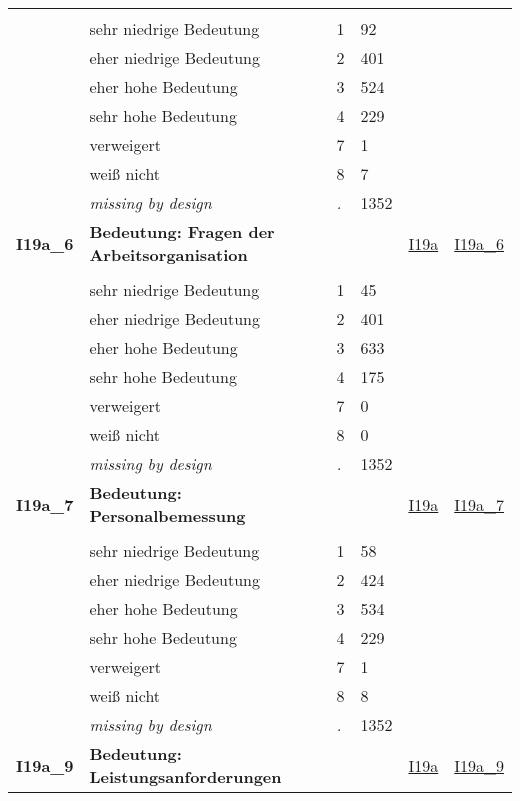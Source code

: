 \begin{longtable}{| L{2.45cm} | L{6cm} | C{1.5cm} | R{1cm} | C{2.25cm} | C{2.25cm} |}
   &  &  &  &  &  \\ 
   & sehr niedrige Bedeutung & 1 & 92 &  &  \\ 
   & eher niedrige Bedeutung & 2 & 401 &  &  \\ 
   & eher hohe Bedeutung & 3 & 524 &  &  \\ 
   & sehr hohe Bedeutung & 4 & 229 &  &  \\ 
   & verweigert & 7 & 1 &  &  \\ 
   & weiß nicht & 8 & 7 &  &  \\ 
   & \textit{missing by design} & \textit{.} & 1352 &  &  \\ 
   \midrule
\textbf{I19a\_6}\label{var:I19a:6} & \textbf{Bedeutung: Fragen der Arbeitsorganisation} &  &  & \hyperref[I19a]{I19a} & \hyperref[var:suf:I19a:6]{I19a\_6} \\ 
   &  &  &  &  &  \\ 
   & sehr niedrige Bedeutung & 1 & 45 &  &  \\ 
   & eher niedrige Bedeutung & 2 & 401 &  &  \\ 
   & eher hohe Bedeutung & 3 & 633 &  &  \\ 
   & sehr hohe Bedeutung & 4 & 175 &  &  \\ 
   & verweigert & 7 & 0 &  &  \\ 
   & weiß nicht & 8 & 0 &  &  \\ 
   & \textit{missing by design} & \textit{.} & 1352 &  &  \\ 
   \midrule
\textbf{I19a\_7}\label{var:I19a:7} & \textbf{Bedeutung: Personalbemessung} &  &  & \hyperref[I19a]{I19a} & \hyperref[var:suf:I19a:7]{I19a\_7} \\ 
   &  &  &  &  &  \\ 
   & sehr niedrige Bedeutung & 1 & 58 &  &  \\ 
   & eher niedrige Bedeutung & 2 & 424 &  &  \\ 
   & eher hohe Bedeutung & 3 & 534 &  &  \\ 
   & sehr hohe Bedeutung & 4 & 229 &  &  \\ 
   & verweigert & 7 & 1 &  &  \\ 
   & weiß nicht & 8 & 8 &  &  \\ 
   & \textit{missing by design} & \textit{.} & 1352 &  &  \\ 
   \midrule
\textbf{I19a\_9}\label{var:I19a:9} & \textbf{Bedeutung: Leistungsanforderungen} &  &  & \hyperref[I19a]{I19a} & \hyperref[var:suf:I19a:9]{I19a\_9} \\ 

\end{longtable}
